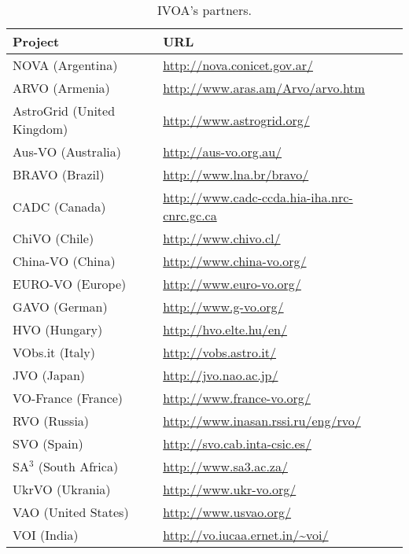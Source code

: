 \begin{table}%
\centering
\begin{tabular}{|l|l|}
	\hline
	\textbf{Project} & \textbf{URL} \\
	\hline
	NOVA (Argentina) & \url{http://nova.conicet.gov.ar/} \\
	\hline
	ARVO (Armenia) & \url{http://www.aras.am/Arvo/arvo.htm} \\
	\hline
	AstroGrid (United Kingdom) & \url{http://www.astrogrid.org/} \\
	\hline
	Aus-VO (Australia) & \url{http://aus-vo.org.au/} \\
	\hline
	BRAVO (Brazil) & \url{http://www.lna.br/bravo/} \\
	\hline
   CADC (Canada) &
    \url{http://www.cadc-ccda.hia-iha.nrc-cnrc.gc.ca} \\
	\hline
    ChiVO (Chile) & \url{http://www.chivo.cl/} \\
	\hline
    China-VO (China) &
    \url{http://www.china-vo.org/} \\
	\hline
	EURO-VO (Europe) & \url{http://www.euro-vo.org/} \\
	\hline
	GAVO (German) & \url{http://www.g-vo.org/} \\
	\hline
	HVO (Hungary) & \url{http://hvo.elte.hu/en/} \\
	\hline
	VObs.it (Italy) & \url{http://vobs.astro.it/} \\
	\hline
	JVO (Japan) & \url{http://jvo.nao.ac.jp/}\\
	\hline
	VO-France (France) & \url{http://www.france-vo.org/} \\
	\hline
	RVO (Russia) & \url{http://www.inasan.rssi.ru/eng/rvo/} \\
	\hline
	SVO (Spain) & \url{http://svo.cab.inta-csic.es/} \\
	\hline
	SA$^3$ (South Africa) & \url{http://www.sa3.ac.za/} \\
	\hline
	UkrVO (Ukrania) & \url{http://www.ukr-vo.org/} \\
	\hline
	VAO (United States) & \url{http://www.usvao.org/} \\
	\hline
	VOI (India) & \url{http://vo.iucaa.ernet.in/~voi/} \\
	\hline
\end{tabular}
\caption{IVOA's partners.}
\label{table:partners}
\end{table}


